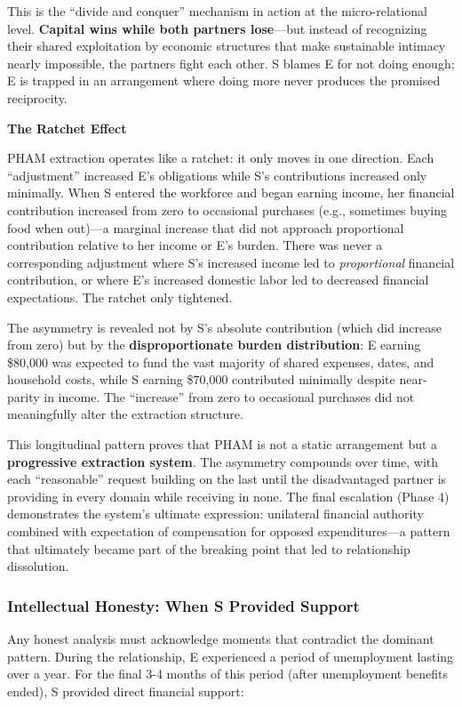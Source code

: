 \documentclass[12pt, letterpaper]{article}
\begin{document}
This is the ``divide and conquer'' mechanism in action at the micro-relational level. \textbf{Capital wins while both partners lose}---but instead of recognizing their shared exploitation by economic structures that make sustainable intimacy nearly impossible, the partners fight each other. S blames E for not doing enough; E is trapped in an arrangement where doing more never produces the promised reciprocity.

\textbf{The Ratchet Effect}

PHAM extraction operates like a ratchet: it only moves in one direction. Each ``adjustment'' increased E's obligations while S's contributions increased only minimally. When S entered the workforce and began earning income, her financial contribution increased from zero to occasional purchases (e.g., sometimes buying food when out)---a marginal increase that did not approach proportional contribution relative to her income or E's burden. There was never a corresponding adjustment where S's increased income led to \textit{proportional} financial contribution, or where E's increased domestic labor led to decreased financial expectations. The ratchet only tightened.

The asymmetry is revealed not by S's absolute contribution (which did increase from zero) but by the \textbf{disproportionate burden distribution}: E earning \$80,000 was expected to fund the vast majority of shared expenses, dates, and household costs, while S earning \$70,000 contributed minimally despite near-parity in income. The ``increase'' from zero to occasional purchases did not meaningfully alter the extraction structure.

This longitudinal pattern proves that PHAM is not a static arrangement but a \textbf{progressive extraction system}. The asymmetry compounds over time, with each ``reasonable'' request building on the last until the disadvantaged partner is providing in every domain while receiving in none. The final escalation (Phase 4) demonstrates the system's ultimate expression: unilateral financial authority combined with expectation of compensation for opposed expenditures---a pattern that ultimately became part of the breaking point that led to relationship dissolution.

\subsubsection{Intellectual Honesty: When S Provided Support}

Any honest analysis must acknowledge moments that contradict the dominant pattern. During the relationship, E experienced a period of unemployment lasting over a year. For the final 3-4 months of this period (after unemployment benefits ended), S provided direct financial support:
\end{document}
